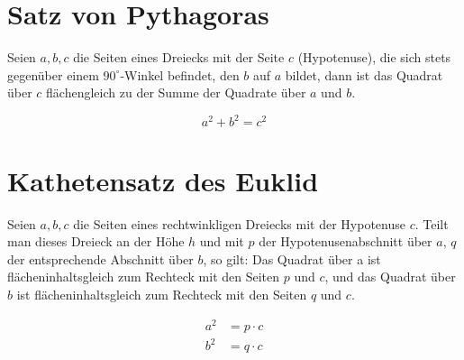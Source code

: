 \documentclass{article}
\begin{document}
\section{Satz von Pythagoras}

\begin{figure}[h]
\centering
{}
\end{figure}

Seien $a, b, c$ die Seiten eines Dreiecks mit der Seite $c$ (Hypotenuse), die sich stets gegenüber einem $90^\circ$-Winkel befindet, den $b$ auf $a$ bildet, dann ist das Quadrat über $c$ flächengleich zu der Summe der Quadrate über $a$ und $b$.

\begin{equation}
a^2 + b^2 = c^2
\end{equation}

\section{Kathetensatz des Euklid}

Seien $a, b, c$ die Seiten eines rechtwinkligen Dreiecks mit der Hypotenuse $c$. Teilt man dieses Dreieck an der Höhe $h$ und mit $p$ der Hypotenusenabschnitt über $a$, $q$ der entsprechende Abschnitt über $b$, so gilt:
Das Quadrat über a ist flächeninhaltsgleich zum Rechteck mit den Seiten $p$ und $c$, und das Quadrat über $b$ ist flächeninhaltsgleich zum Rechteck mit den Seiten $q$ und $c$.

\begin{align}
a^2 &= p\cdot c\\
b^2 &= q\cdot c
\end{align}
\end{document}

